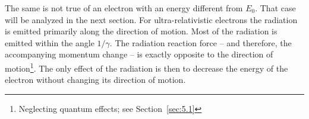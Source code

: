The same is not true of an electron with an energy different from $E_0$. That
case will be analyzed in the next section.
For ultra-relativistic electrons the radiation is emitted primarily along the direction of motion. Most of the radiation is emitted within the angle $1/\gamma$. The radiation reaction force -- and therefore, the accompanying momentum change -- is exactly opposite to the direction
 of motion\footnote{Neglecting quantum effects; see Section~\ref{sec:5.1}}. The only effect of the radiation is then to decrease the energy of the electron without changing its direction
 of motion.
